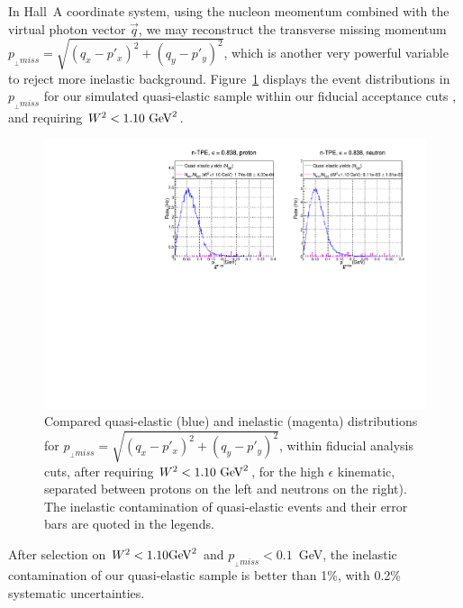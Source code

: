 In Hall~A coordinate system, using the nucleon meomentum combined with the virtual photon vector $\vec{q}$, we may reconstruct the transverse missing momentum $p_{_{\perp} miss} = \sqrt{(q_{x}-p'_{x})^2+(q_{y}-p'_{y})^2}$, which is another very powerful variable to reject more inelastic background.
Figure~\ref{fig:pperp} displays the event distributions in $p_{_{\perp} miss}$ for our simulated quasi-elastic sample within our fiducial acceptance cuts%
, and requiring $W^2<1.10~{\rm GeV}^2$.
%
\begin{figure}[h]
  \centering
    \includegraphics[width=12cm]{Answers_Readers/gen-tpe_he_pperp_acc_real_new.pdf}
    \caption{Compared quasi-elastic (blue) and inelastic (magenta) distributions for $p_{_{\perp} miss} = \sqrt{(q_{x}-p'_{x})^2+(q_{y}-p'_{y})^2}$, within fiducial analysis cuts, after requiring $W^2<1.10~{\rm GeV}^2$, for the high $\epsilon$ kinematic, separated between protons on the left and neutrons on the right). The inelastic contamination of quasi-elastic events and their error bars are quoted in the legends.}
    \label{fig:pperp}
\end{figure}
%
After selection on $W^2 <1.10 {\rm GeV}^2$ and $p_{_{\perp} miss} <0.1$~GeV, the inelastic contamination of our quasi-elastic sample is better than 1\%, with 0.2\% systematic uncertainties.

